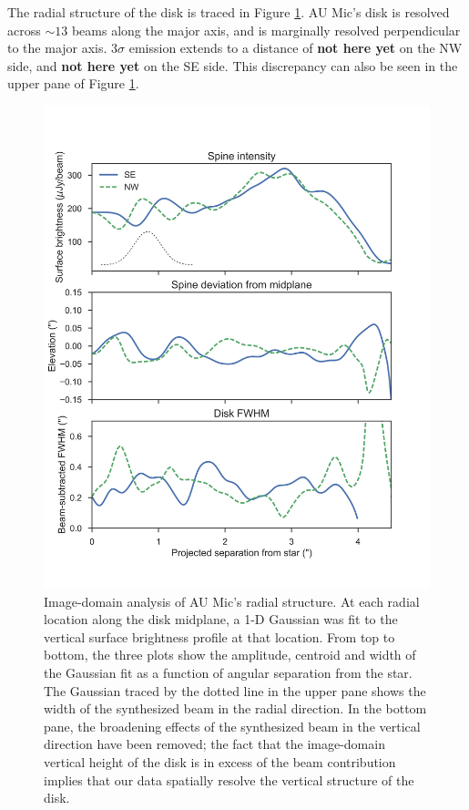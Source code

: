 \documentclass[12pt,oneside]{book}
\begin{document}
The radial structure of the disk is traced in Figure \ref{fig: boccaletti}. 
AU Mic's disk is resolved across $\sim13$ beams along the major axis, and is marginally resolved perpendicular to the major axis.
$3\sigma$ emission extends to a distance of \textbf{not here yet} on the NW side, and \textbf{not here yet} on the SE side. 
This discrepancy can also be seen in the upper pane of Figure \ref{fig: boccaletti}. 

\begin{figure}
  \centering
  \includegraphics[width=.75\linewidth]{figures/3_boccaletti_plots}
  \caption{
  Image-domain analysis of AU Mic's radial structure. 
  At each radial location along the disk midplane, a 1-D Gaussian was fit to the vertical surface brightness profile at that location.
  From top to bottom, the three plots show the amplitude, centroid and width of the Gaussian fit as a function of angular separation from the star. 
  The Gaussian traced by the dotted line in the upper pane shows the width of the  synthesized beam in the radial direction.
  In the bottom pane, the broadening effects of the synthesized beam in the vertical direction have been removed; the fact that the image-domain vertical height of the disk is in excess of the beam contribution implies that our data spatially resolve the vertical structure of the disk.} 
  \label{fig: boccaletti}
\end{figure}
\end{document}
